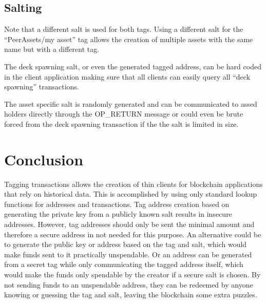 \documentclass[a4paper,10pt]{article}
\begin{document}
\subsection{Salting}
Note that a different salt is used for both tags.
Using a different salt for the ``PeerAssets/my asset'' tag allows the creation of multiple assets with the same name but with a different tag.

The deck spawning salt, or even the generated tagged address, can be hard coded in the client application making sure that all clients can easily query all ``deck spawning'' transactions.

The asset specific salt is randomly generated and can be communicated to assed holders directly through the OP\_RETURN message or could even be brute forced from the deck spawning transaction if the the salt is limited in size.


\section{Conclusion}
Tagging transactions allows the creation of thin clients for blockchain applications that rely on historical data.
This is accomplished by using only standard lookup functions for addresses and transactions.
Tag address creation based on generating the private key from a publicly known salt results in insecure addresses.
However, tag addresses should only be sent the minimal amount and therefore a secure address in not needed for this purpose.
An alternative could be to generate the public key or address based on the tag and salt, which would make funds sent to it practically unspendable.
Or an address can be generated from a secret tag while only communicating the tagged address itself, which would make the funds only spendable by the creator if a secure salt is chosen.
By not sending funds to an unspendable address, they can be redeemed by anyone knowing or guessing the tag and salt, leaving the blockchain some extra puzzles.
\end{document}
